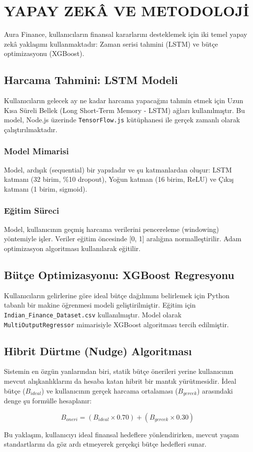 \chapter{YAPAY ZEKÂ VE METODOLOJİ}

Aura Finance, kullanıcıların finansal kararlarını desteklemek için iki temel yapay zekâ yaklaşımı kullanmaktadır: Zaman serisi tahmini (LSTM) ve bütçe optimizasyonu (XGBoost).

\section{Harcama Tahmini: LSTM Modeli}

Kullanıcıların gelecek ay ne kadar harcama yapacağını tahmin etmek için Uzun Kısa Süreli Bellek (Long Short-Term Memory - LSTM) ağları kullanılmıştır. Bu model, Node.js üzerinde \texttt{TensorFlow.js} kütüphanesi ile gerçek zamanlı olarak çalıştırılmaktadır.

\subsection{Model Mimarisi}
Model, ardışık (sequential) bir yapıdadır ve şu katmanlardan oluşur: LSTM katmanı (32 birim, \%10 dropout), Yoğun katman (16 birim, ReLU) ve Çıkış katmanı (1 birim, sigmoid).

\subsection{Eğitim Süreci}
Model, kullanıcının geçmiş harcama verilerini pencereleme (windowing) yöntemiyle işler. Veriler eğitim öncesinde [0, 1] aralığına normalleştirilir. Adam optimizasyon algoritması kullanılarak eğitilir.

\section{Bütçe Optimizasyonu: XGBoost Regresyonu}

Kullanıcıların gelirlerine göre ideal bütçe dağılımını belirlemek için Python tabanlı bir makine öğrenmesi modeli geliştirilmiştir. Eğitim için \texttt{Indian\_Finance\_Dataset.csv} kullanılmıştır. Model olarak \texttt{MultiOutputRegressor} mimarisiyle XGBoost algoritması tercih edilmiştir.

\section{Hibrit Dürtme (Nudge) Algoritması}

Sistemin en özgün yanlarından biri, statik bütçe önerileri yerine kullanıcının mevcut alışkanlıklarını da hesaba katan hibrit bir mantık yürütmesidir. İdeal bütçe ($B_{ideal}$) ve kullanıcının gerçek harcama ortalaması ($B_{gercek}$) arasındaki denge şu formülle hesaplanır:

\begin{equation}
   B_{oneri} = (B_{ideal} \times 0.70) + (B_{gercek} \times 0.30)
\end{equation}

Bu yaklaşım, kullanıcıyı ideal finansal hedeflere yönlendirirken, mevcut yaşam standartlarını da göz ardı etmeyerek gerçekçi bütçe hedefleri sunar.
